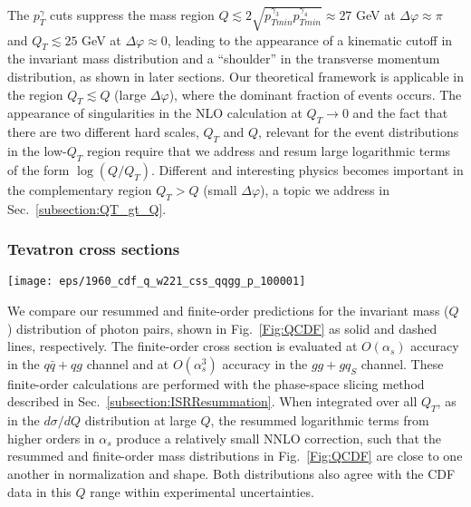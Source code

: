 \documentclass[12pt,english,aps,preprint,prd,letterpaper,fleqn,nofootinbib,showpacs,showkeys,tightenlines,floatfix]{revtex4}
\begin{document}
The $p_{T}^{\gamma}$ cuts suppress the mass region 
$Q\lesssim2\sqrt{p_{Tmin}^{\gamma_{3}}p_{Tmin}^{\gamma_{4}}}\approx27$
GeV at $\Delta\varphi\approx\pi$ and $Q_{T}\lesssim25$ GeV at $\Delta\varphi\approx0$,
leading to the appearance of a kinematic cutoff in the invariant mass
distribution and a {}``shoulder'' in the transverse momentum distribution,
as shown in later sections. Our theoretical framework is applicable
in the region $Q_{T}\lesssim Q$ (large $\Delta\varphi$), where the dominant
fraction of events occurs. The appearance of singularities in the
NLO calculation at $Q_{T}\rightarrow0$ and the fact that there are
two different hard scales, $Q_{T}$ and $Q$, relevant for the event
distributions in the low-$Q_{T}$ region require that we address and
resum large logarithmic terms of the form $\log(Q/Q_{T})$. 
Different and interesting physics becomes important in the complementary
region $Q_{T}>Q$ (small $\Delta\varphi$), a topic we address in  
Sec.~\ref{subsection:QT_gt_Q}.

\subsubsection{Tevatron cross sections \label{subsection:XSecTeV}}

\begin{figure*}
\texttt{[image: eps/1960\_cdf\_q\_w221\_css\_qqgg\_p\_100001]}


\caption{Invariant mass distributions of photon pairs in $p\bar{p}\rightarrow\gamma\gamma X$
at $\sqrt{S}=1.96$~TeV with QCD contributions calculated in the
soft--gluon resummation formalism (red solid) and at NLO (blue dashed).
The calculations include the cuts used by the CDF collaboration whose
data are shown~\cite{Acosta:2004sn}. \label{Fig:QCDF}}
\end{figure*}


We compare our resummed and finite-order predictions for the invariant
mass ($Q$) distribution of photon pairs, shown in Fig.~\ref{Fig:QCDF}
as solid and dashed lines, respectively. The finite-order cross section
is evaluated at $O(\alpha_{s})$ accuracy in the $q\bar{q}+qg$ channel
and at $O(\alpha_{s}^{3})$ accuracy in the $gg+gq_{S}$ channel. These finite-order 
calculations are performed with the phase-space slicing method described
in Sec.~\ref{subsection:ISRResummation}. When integrated over all
$Q_{T}$, as in the $d\sigma/dQ$ distribution at large $Q$, the
resummed logarithmic terms from higher orders in $\alpha_{s}$ produce
a relatively small NNLO correction, such that the resummed and finite-order
mass distributions in Fig.~\ref{Fig:QCDF} are close to one another
in normalization and shape. Both distributions also agree with the
CDF data in this $Q$ range within experimental uncertainties.
\end{document}
